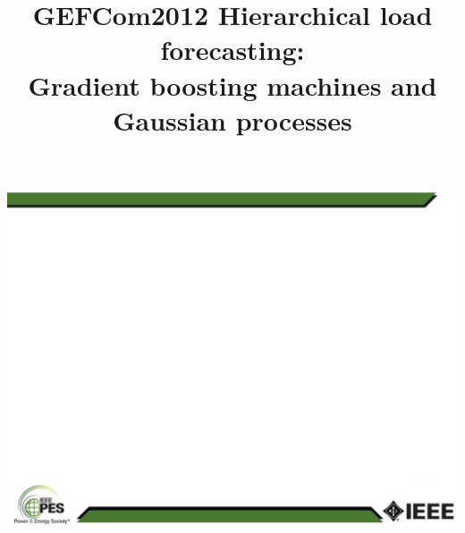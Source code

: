 

\def\Black{\textcolor{Black}}
\def\White{\textcolor{White}}
\def\Blue{\textcolor{DarkBlue}}
\def\Magenta{\textcolor{DarkMagenta}}
\def\Red{\textcolor{Red}}
\def\Green{\textcolor{DarkGreen}}




\usepackage{alltt}
\usepackage{psfrag}
\usepackage{pstool}
\usepackage{multicol}
\usepackage{tabularx}
\usepackage{preamble}

\def\newarrow{\mbox{\begin{tikzpicture}
             \useasboundingbox{(-3pt,-4.5pt) rectangle (19pt,1pt)};
             \draw[->] (0,-0.07)--(17pt,-0.07);\end{tikzpicture}}}
             
 {\includegraphics[width=\paperwidth,height=\paperheight,keepaspectratio]{2010-PES-PPT-Template-v2007.pdf}}

\title[] %
{GEFCom2012 Hierarchical load forecasting:\\Gradient boosting machines and Gaussian processes}

